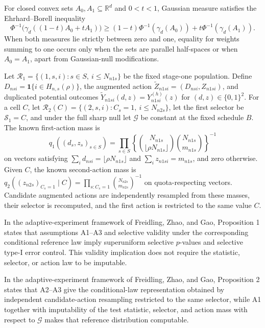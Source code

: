 For closed convex sets \(A_0,A_1\subseteq\mathbb R^d\) and \(0<t<1\), Gaussian measure satisfies the Ehrhard--Borell inequality
\[
\Phi^{-1}\!\bigl(\gamma_d((1-t)A_0+tA_1)\bigr)\ge(1-t)\Phi^{-1}(\gamma_d(A_0))+t\Phi^{-1}(\gamma_d(A_1)).
\]
When both measures lie strictly between zero and one, equality for weights summing to one occurs only when the sets are parallel half-spaces or when \(A_0=A_1\), apart from Gaussian-null modifications.

Let \(\mathcal R_1=\{(1,s,i):s\in S,\ i\le N_{n1s}\}\) be the fixed stage-one population.  Define \(D_{nsi}=\mathbf 1\{i\in H_{n,s}(\rho)\}\), the augmented action \(\widetilde Z_{n1si}=(D_{nsi},Z_{n1si})\), and duplicated potential outcomes \(\widetilde Y_{n1si}(d,z)=Y^{(h)}_{n1si}(z)\) for \((d,z)\in\{0,1\}^2\).  For a cell \(C\), let \(\mathcal R_2(C)=\{(2,s,i):C_s=1,\ i\le N_{n2s}\}\), let the first selector be \(\mathcal S_1=C\), and under the full sharp null let \(\mathcal G\) be constant at the fixed schedule \(B\).  The known first-action mass is
\[
q_1((d_s,z_s)_{s\in S})=
\prod_{s\in S}
\left\{
\binom{N_{n1s}}{\lfloor\rho N_{n1s}\rfloor}
\binom{N_{n1s}}{m_{n1s}}
\right\}^{-1}
\]
on vectors satisfying \(\sum_i d_{nsi}=\lfloor\rho N_{n1s}\rfloor\) and \(\sum_i z_{n1si}=m_{n1s}\), and zero otherwise.  Given \(C\), the known second-action mass is \(q_2((z_{n2s})_{C_s=1}\mid C)=\prod_{s:C_s=1}\binom{N_{n2s}}{m_{n2s}}^{-1}\) on quota-respecting vectors.  Candidate augmented actions are independently resampled from these masses, their selector is recomputed, and the first action is restricted to the same value \(C\).

In the adaptive-experiment framework of Freidling, Zhao, and Gao, Proposition 1 states that assumptions A1--A3 and selective validity under the corresponding conditional reference law imply superuniform selective \(p\)-values and selective type-I error control.  This validity implication does not require the statistic, selector, or action law to be imputable.

In the adaptive-experiment framework of Freidling, Zhao, and Gao, Proposition 2 states that A2--A3 give the conditional-law representation obtained by independent candidate-action resampling restricted to the same selector, while A1 together with imputability of the test statistic, selector, and action mass with respect to \(\mathcal G\) makes that reference distribution computable.

